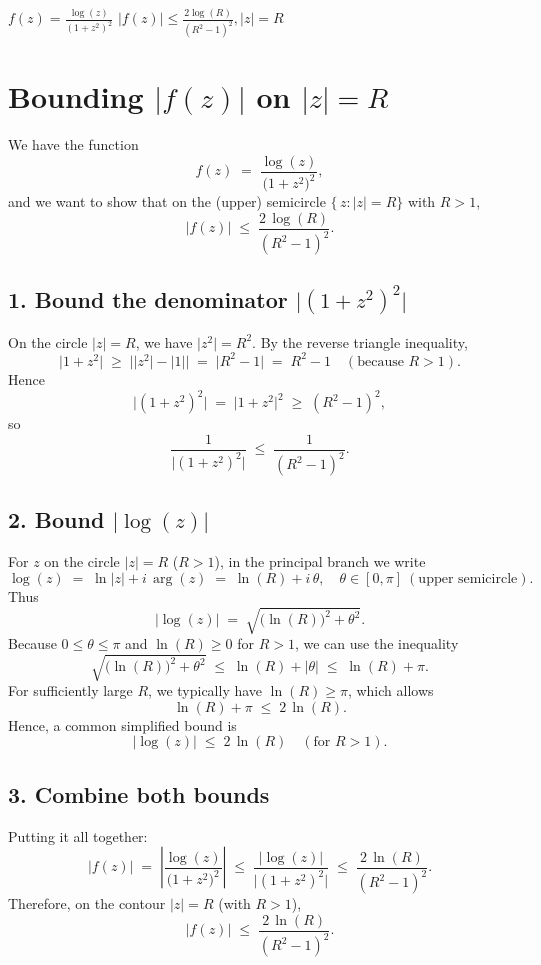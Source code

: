 \documentclass[12pt]{article}
\theoremstyle{definition} %
\theoremstyle{plain} %
\begin{document}
$f(z)=\frac{\log(z)}{(1+z^{2})^{2}}$
$\left\vert f(z) \right\vert \leq \frac{2\log(R)}{(R^{2}-1)^{2}}, \left\vert z \right\vert = R$ 


\section*{Bounding \(\left| f(z)\right|\) on \(\lvert z\rvert = R\)}

We have the function
\[
f(z) \;=\; \frac{\log(z)}{\bigl(1 + z^2\bigr)^2},
\]
and we want to show that on the (upper) semicircle \(\{\,z : |z| = R\}\) with \(R>1\),
\[
\bigl|f(z)\bigr|
\;\le\;
\frac{2\,\log(R)}{(R^2 - 1)^2}.
\]

\subsection*{1. Bound the denominator \(\lvert (1 + z^2)^2\rvert\)}
On the circle \(\lvert z\rvert = R\), we have \(\lvert z^2\rvert = R^2\). By the reverse triangle inequality,
\[
\lvert 1 + z^2 \rvert
\;\ge\;
\bigl|\lvert z^2\rvert - \lvert 1\rvert\bigr|
\;=\;
\lvert R^2 - 1\rvert
\;=\;
R^2 - 1
\quad (\text{because }R>1).
\]
Hence
\[
\lvert (1 + z^2)^2\rvert
\;=\;
\bigl\lvert 1 + z^2\bigr\rvert^2
\;\ge\;
(R^2 - 1)^2,
\]
so
\[
\frac{1}{\lvert (1 + z^2)^2\rvert}
\;\le\;
\frac{1}{(R^2 - 1)^2}.
\]

\subsection*{2. Bound \(\lvert \log(z)\rvert\)}
For \(z\) on the circle \(\lvert z\rvert = R\) (\(R>1\)), in the principal branch we write
\[
\log(z)
\;=\;
\ln\!\bigl|z\bigr| + i\,\arg(z)
\;=\;
\ln(R) + i\,\theta,
\quad
\theta \in [0, \pi]
\ (\text{upper semicircle}).
\]
Thus
\[
\lvert \log(z)\rvert
\;=\;
\sqrt{\bigl(\ln(R)\bigr)^2 + \theta^2}.
\]
Because \(0 \le \theta \le \pi\) and \(\ln(R)\ge 0\) for \(R>1\), we can use the inequality
\[
\sqrt{\bigl(\ln(R)\bigr)^2 + \theta^2}
\;\le\;
\ln(R) + \lvert \theta\rvert
\;\le\;
\ln(R) + \pi.
\]
For sufficiently large \(R\), we typically have \(\ln(R) \ge \pi\), which allows
\[
\ln(R) + \pi \;\le\; 2\,\ln(R).
\]
Hence, a common simplified bound is
\[
\lvert \log(z)\rvert 
\;\le\;
2\,\ln(R)
\quad (\text{for }R>1).
\]

\subsection*{3. Combine both bounds}
Putting it all together:
\[
\bigl|f(z)\bigr|
\;=\;
\left|\frac{\log(z)}{\bigl(1 + z^2\bigr)^2}\right|
\;\le\;
\frac{\lvert \log(z)\rvert}{\lvert (1 + z^2)^2\rvert}
\;\le\;
\frac{2\,\ln(R)}{(R^2 - 1)^2}.
\]
Therefore, on the contour \(\lvert z\rvert = R\) (with \(R>1\)),
\[
\boxed{
\lvert f(z)\rvert
\;\le\;
\frac{2\,\ln(R)}{(R^2 - 1)^2}.
}
\]
\end{document}
